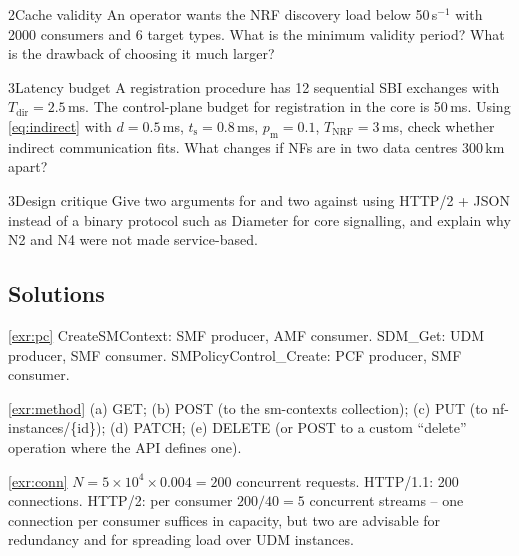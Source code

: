 \documentclass[11pt,a4paper]{article}
\begin{document}
\begin{exercisebox}{2}{Cache validity}\label{exr:validity}
An operator wants the NRF discovery load below 50\,s$^{-1}$ with 2000 consumers and 6 target types. What is the minimum validity
period? What is the drawback of choosing it much larger?
\end{exercisebox}

\begin{exercisebox}{3}{Latency budget}\label{exr:budget}
A registration procedure has 12 sequential SBI exchanges with $T_{\mathrm{dir}} = 2.5$\,ms. The control-plane budget for registration in
the core is 50\,ms. Using \cref{eq:indirect} with $d = 0.5$\,ms, $t_{\mathrm{s}} = 0.8$\,ms, $p_{\mathrm{m}} = 0.1$, $T_{\mathrm{NRF}} = 3$\,ms, check
whether indirect communication fits. What changes if NFs are in two data centres 300\,km apart?
\end{exercisebox}

\begin{exercisebox}{3}{Design critique}\label{exr:critique}
Give two arguments for and two against using HTTP/2 + JSON instead of a binary protocol such as Diameter for core signalling, and
explain why N2 and N4 were not made service-based.
\end{exercisebox}

\subsection*{Solutions}

\begin{solutionbox}{\ref{exr:pc}}
CreateSMContext: SMF producer, AMF consumer. SDM\_Get: UDM producer, SMF consumer. SMPolicyControl\_Create: PCF producer, SMF consumer.
\end{solutionbox}

\begin{solutionbox}{\ref{exr:method}}
(a) GET; (b) POST (to the sm-contexts collection); (c) PUT (to nf-instances/\{id\}); (d) PATCH; (e) DELETE (or POST to a custom
``delete'' operation where the API defines one).
\end{solutionbox}

\begin{solutionbox}{\ref{exr:conn}}
$N = 5\times10^4\times0.004 = 200$ concurrent requests. HTTP/1.1: 200 connections. HTTP/2: per consumer $200/40 = 5$ concurrent streams --
one connection per consumer suffices in capacity, but two are advisable for redundancy and for spreading load over UDM instances.
\end{solutionbox}
\end{document}

